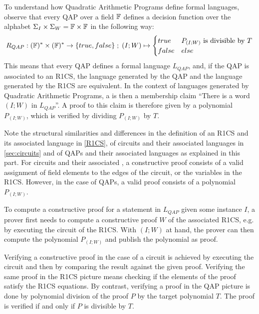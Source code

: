 To understand how Quadratic Arithmetic Programs define formal languages, observe that every QAP over a field $\mathbb{F}$ defines a decision function over the alphabet $\Sigma_I \times \Sigma_W = \mathbb{F} \times \mathbb{F}$ in the following way:
\begin{equation}
R_{QAP} : (\mathbb{F})^* \times (\mathbb{F})^* \to \{true, false\}\;;\;
(I;W) \mapsto
\begin{cases}
true & P_{(I;W)} \text{ is divisible by } T\\
false & else
\end{cases}
\end{equation}
This means that every QAP defines a formal language $L_{QAP}$, and, if the QAP is associated to an R1CS, the language generated by the QAP and the language generated by the R1CS are equivalent. In the context of languages generated by Quadratic Arithmetic Programs, a  is then a membership claim ``There is a word $(I;W)$ in $L_{QAP}$''. A proof to this claim is therefore given by a polynomial $P_{(I;W)}$, which is verified by dividing $P_{(I;W)}$ by $T$.

Note the structural similarities and differences in the definition of an R1CS and its associated language in \ref{R1CS}, of circuits and their associated languages in \ref{sec:circuits} and of QAPs and their associated languages as explained in this part. For circuits and their associated , a constructive proof consists of a valid assignment of field elements to the edges of the circuit, or the variables in the R1CS. However, in the case of QAPs, a valid proof consists of a polynomial $P_{(I;W)}$.

To compute a constructive proof for a statement in $L_{QAP}$ given some instance $I$, a prover first needs to compute a constructive proof $W$ of the associated R1CS, e.g. by executing the circuit of the R1CS. With $(I;W)$ at hand, the prover can then compute the polynomial $P_{(I;W)}$ and publish the polynomial as proof.

Verifying a constructive proof in the case of a circuit is achieved by executing the circuit and then by comparing the result against the given proof. Verifying the same proof in the R1CS picture means checking if the elements of the proof satisfy the R1CS equations. By contrast, verifying a proof in the QAP picture is done by polynomial division of the proof $P$ by the target polynomial $T$. The proof is verified if and only if $P$ is divisible by $T$.


